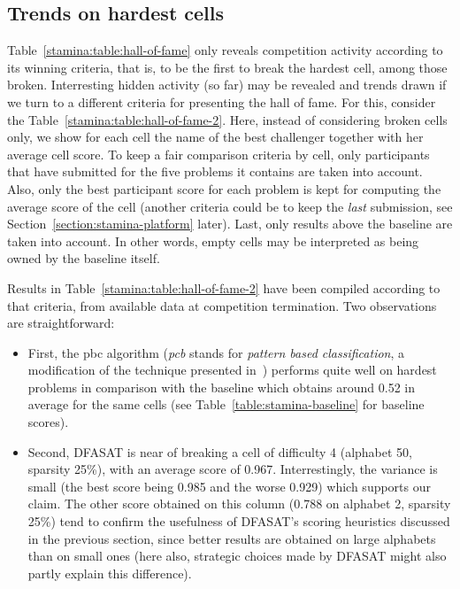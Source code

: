 \subsection{Trends on hardest cells\label{subsection:stamina-trends-on-hardest-cells}}

Table~\ref{stamina:table:hall-of-fame} only reveals competition activity according to its winning criteria, that is, to be the first to break the hardest cell, among those broken. Interresting hidden activity (so far) may be revealed and trends drawn if we turn to a different criteria for presenting the hall of fame. For this, consider the Table~\ref{stamina:table:hall-of-fame-2}. Here, instead of considering broken cells only, we show for each cell the name of the best challenger together with her average cell score. To keep a fair comparison criteria by cell, only participants that have submitted for the five problems it contains are taken into account. Also, only the best participant score for each problem is kept for computing the average score of the cell (another criteria could be to keep the \emph{last} submission, see Section~\ref{section:stamina-platform} later). Last, only results above the baseline are taken into account. In other words, empty cells may be interpreted as being owned by the baseline itself. 

Results in Table~\ref{stamina:table:hall-of-fame-2} have been compiled according to that criteria, from available data at competition termination. Two observations are straightforward: 

\begin{itemize}

\item First, the pbc algorithm (\emph{pcb} stands for \emph{pattern based classification}, a modification of the technique presented in~\cite{Lo:2009}) performs quite well on hardest problems in comparison with the baseline which obtains around 0.52 in average for the same cells (see Table~\ref{table:stamina-baseline} for baseline scores). 

\item Second, DFASAT is near of breaking a cell of difficulty 4 (alphabet 50, sparsity 25\%), with an average score of 0.967. Interrestingly, the variance is small (the best score being 0.985 and the worse 0.929) which supports our claim. The other score obtained on this column (0.788 on alphabet 2, sparsity 25\%) tend to confirm the usefulness of DFASAT's scoring heuristics discussed in the previous section, since better results are obtained on large alphabets than on small ones (here also, strategic choices made by DFASAT might also partly explain this difference).

\end{itemize}

